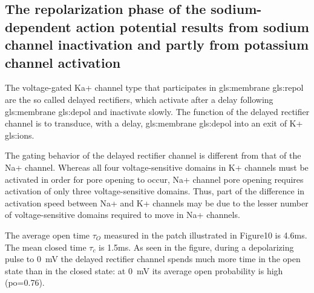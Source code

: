 \documentclass[class={myRUCProject}, crop=false]{standalone}
\begin{document}
\subsection{The repolarization phase of the sodium-dependent action potential results from sodium channel inactivation and partly from potassium channel activation}

The voltage-gated Ka+ channel type that participates in \gls{gls:membrane} \gls{gls:repol} are the so called delayed rectifiers, which activate after a delay following \gls{gls:membrane} \gls{gls:depol} and inactivate slowly. The function of the delayed rectifier channel is to transduce, with a delay, \gls{gls:membrane} \gls{gls:depol} into an exit of K+ \glspl{gls:ion}. 

The gating behavior of the delayed rectifier channel is different from that of the Na+ channel. Whereas all four voltage-sensitive domains in K+ channels must be activated in order for pore opening to occur, Na+ channel pore opening requires activation of only three voltage-sensitive domains. Thus, part of the difference in activation speed between Na+ and K+ channels may be due to the lesser number of voltage-sensitive domains required to move in Na+ channels.

The average open time \(\tau_O\) measured in the patch illustrated in Figure10 is 4.6ms. The mean closed time \(\tau_c\) is 1.5ms. As seen in the figure, during a depolarizing pulse to \qty{0}{\mV} the delayed rectifier channel spends much more time in the open state than in the closed state: at \qty{0}{\mV} its average open probability is high (po=0.76).
\end{document}
